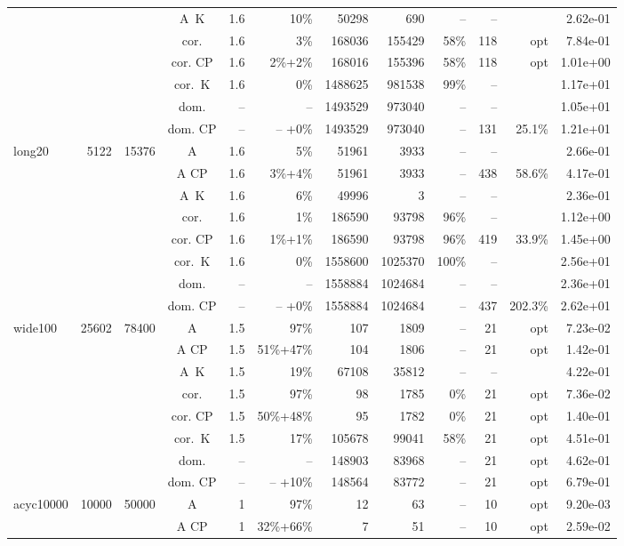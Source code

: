 \documentclass[11pt]{amsart}
\newenvironment{outdent}
{\begin{list}{}{\leftmargin-2cm\rightmargin\leftmargin}\centering\item\relax}
{\end{list}\ignorespacesafterend}
\theoremstyle{plain}
\theoremstyle{remark}
\begin{document}
\begin{table}
\begin{outdent}
\begin{footnotesize}
\begin{tabular}{|l|rrc|rr|rrr|rr|r|}
&&&A~K & 1.6 & 10\% &50298 & 690 & -- & -- & & 2.62e-01 \\
&&&cor. & 1.6 & 3\% &168036 & 155429 & 58\% &118 & opt & 7.84e-01 \\
&&&cor. CP & 1.6 & 2\%+2\% &168016 & 155396 & 58\% &118 & opt & 1.01e+00 \\
&&&cor.~K & 1.6 & 0\% &1488625 & 981538 & 99\% & -- & & 1.17e+01 \\
&&&dom. & -- & --  &1493529 & 973040 & -- & -- & & 1.05e+01 \\
&&&dom. CP & -- & -- +0\% &1493529 & 973040 & -- &131 & 25.1\% & 1.21e+01 \\
\hline
long20 & 5122 & 15376 & A & 1.6 & 5\% &51961 & 3933 & -- & -- & & 2.66e-01 \\
&&&A CP & 1.6 & 3\%+4\% &51961 & 3933 & -- &438 & 58.6\% & 4.17e-01 \\
&&&A~K & 1.6 & 6\% &49996 & 3 & -- & -- & & 2.36e-01 \\
&&&cor. & 1.6 & 1\% &186590 & 93798 & 96\% & -- & & 1.12e+00 \\
&&&cor. CP & 1.6 & 1\%+1\% &186590 & 93798 & 96\% &419 & 33.9\% & 1.45e+00 \\
&&&cor.~K & 1.6 & 0\% &1558600 & 1025370 & 100\% & -- & & 2.56e+01 \\
&&&dom. & -- & --  &1558884 & 1024684 & -- & -- & & 2.36e+01 \\
&&&dom. CP & -- & -- +0\% &1558884 & 1024684 & -- &437 & 202.3\% & 2.62e+01 \\
\hline
wide100 & 25602 & 78400 & A & 1.5 & 97\% &107 & 1809 & -- &21 & opt & 7.23e-02 \\
&&&A CP & 1.5 & 51\%+47\% &104 & 1806 & -- &21 & opt & 1.42e-01 \\
&&&A~K & 1.5 & 19\% &67108 & 35812 & -- & -- & & 4.22e-01 \\
&&&cor. & 1.5 & 97\% &98 & 1785 & 0\% &21 & opt & 7.36e-02 \\
&&&cor. CP & 1.5 & 50\%+48\% &95 & 1782 & 0\% &21 & opt & 1.40e-01 \\
&&&cor.~K & 1.5 & 17\% &105678 & 99041 & 58\% &21 & opt & 4.51e-01 \\
&&&dom. & -- & --  &148903 & 83968 & -- &21 & opt & 4.62e-01 \\
&&&dom. CP & -- & -- +10\% &148564 & 83772 & -- &21 & opt & 6.79e-01 \\
\hline
acyc10000 & 10000 & 50000 & A & 1 & 97\% &12 & 63 & -- &10 & opt & 9.20e-03 \\
&&&A CP & 1 & 32\%+66\% &7 & 51 & -- &10 & opt & 2.59e-02 \\

\end{tabular}
\end{footnotesize}
\end{outdent}
\end{table}
\end{document}
